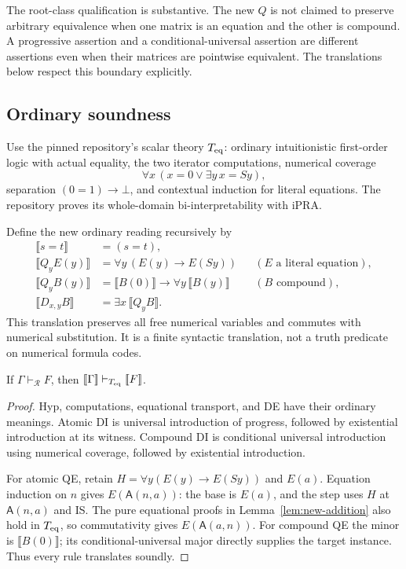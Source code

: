 The root-class qualification is substantive.  The new $Q$ is not claimed to
preserve arbitrary equivalence when one matrix is an equation and the other
is compound.  A progressive assertion and a conditional-universal assertion
are different assertions even when their matrices are pointwise equivalent.
The translations below respect this boundary explicitly.

\subsection{Ordinary soundness}
\label{subsec:new-soundness}

Use the pinned repository's scalar theory $T_{\rm eq}$: ordinary
intuitionistic first-order logic with actual equality, the two iterator
computations, numerical coverage
\[
 \forall x\,(x=0\lor\exists y\,x=Sy),
\]
separation $(0=1)\to\bot$, and contextual induction for literal equations.
The repository proves its whole-domain bi-interpretability with iPRA.\cite{bridge}

Define the new ordinary reading recursively by
\begin{equation}
 \begin{aligned}
 \llbracket s=t\rrbracket&=(s=t),\\
 \llbracket Q_yE(y)\rrbracket
   &=\forall y\,(E(y)\to E(Sy))
       &&(E\text{ a literal equation}),\\
 \llbracket Q_yB(y)\rrbracket
   &=\llbracket B(0)\rrbracket\to
                  \forall y\,\llbracket B(y)\rrbracket
       &&(B\text{ compound}),\\
 \llbracket D_{x,y}B\rrbracket
   &=\exists x\,\llbracket Q_yB\rrbracket.
 \end{aligned}
 \label{eq:new-reading}
\end{equation}
This translation preserves all free numerical variables and commutes with
numerical substitution.  It is a finite syntactic translation, not a truth
predicate on numerical formula codes.

\begin{theorem}[Soundness]
\label{thm:new-soundness}
If $\Gamma\vdash_{\mathcal R}F$, then
$\llbracket\Gamma\rrbracket\vdash_{T_{\rm eq}}\llbracket F\rrbracket$.
\end{theorem}
\begin{proof}
Hyp, computations, equational transport, and DE have their ordinary meanings.
Atomic DI is universal introduction of progress, followed by existential
introduction at its witness.  Compound DI is conditional universal
introduction using numerical coverage, followed by existential introduction.

For atomic QE, retain
$H=\forall y(E(y)\to E(Sy))$ and $E(a)$.
Equation induction on $n$ gives $E(\mathsf A(n,a))$: the base is $E(a)$,
and the step uses $H$ at $\mathsf A(n,a)$ and IS.  The pure equational
proofs in Lemma~\ref{lem:new-addition} also hold in $T_{\rm eq}$, so
commutativity gives $E(\mathsf A(a,n))$.  For compound QE the minor is
$\llbracket B(0)\rrbracket$; its conditional-universal major directly
supplies the target instance.  Thus every rule translates soundly.
\end{proof}

